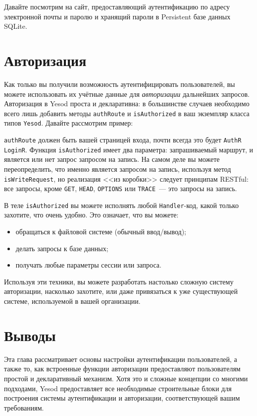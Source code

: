Давайте посмотрим на сайт, предоставляющий аутентификацию по адресу электронной
почты и паролю и хранящий пароли в Persistent базе данных SQLite.


\section{Авторизация}

Как только вы получили возможность аутентифицировать пользователей, вы можете
использовать их учётные данные для \emph{авторизации} дальнейших запросов.
Авторизация в Yesod проста и декларативна: в большинстве случаев необходимо
всего лишь добавить методы \lstinline'authRoute' и \lstinline'isAuthorized' в
ваш экземпляр класса типов \lstinline'Yesod'. Давайте рассмотрим пример:


\lstinline'authRoute' должен быть вашей страницей входа, почти всегда это будет
\lstinline'AuthR LoginR'. Функция \lstinline'isAuthorized' имеет два параметра:
запрашиваемый маршрут, и является или нет запрос запросом на запись. На самом
деле вы можете переопределить, что именно является запросом на запись,
используя метод \lstinline'isWriteRequest', но реализация <<из коробки>>
следует принципам RESTful: все запросы, кроме \lstinline'GET',
\lstinline'HEAD', \lstinline'OPTIONS' или \lstinline'TRACE'~--- это запросы на
запись.

В теле \lstinline'isAuthorized' вы можете исполнять любой
\lstinline'Handler'-код, какой только захотите, что очень удобно. Это означает,
что вы можете:

\begin{itemize}
    \item обращаться к файловой системе (обычный ввод/вывод);

    \item делать запросы к базе данных;

    \item получать любые параметры сессии или запроса.
\end{itemize}

Используя эти техники, вы можете разработать настолько сложную систему
авторизации, насколько захотите, или даже привязаться к уже существующей
системе, используемой в вашей организации.

\section{Выводы}

Эта глава рассматривает основы настройки аутентификации пользователей, а также
то, как встроенные функции авторизации предоставляют пользователям простой и
декларативный механизм. Хотя это и сложные концепции со многими подходами,
Yesod предоставляет все необходимые строительные блоки для построения системы
аутентификации и авторизации, соответствующей вашим требованиям.
